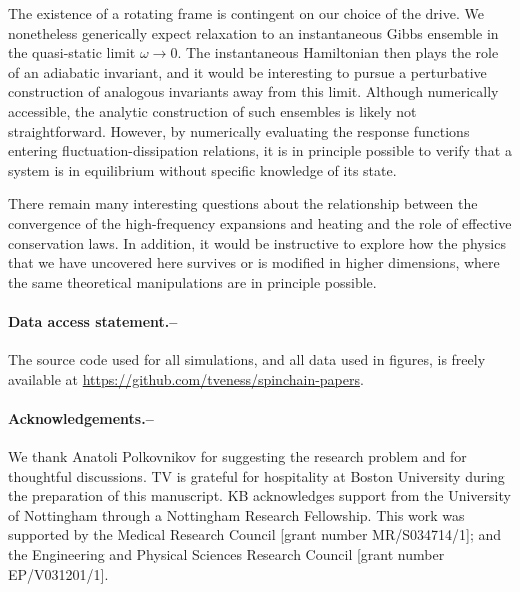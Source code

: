 \documentclass[prl,aps,twocolumn,notitlepage,10pt]{revtex4-1}
\begin{document}
The existence of a rotating frame is contingent on our choice of the drive.
We nonetheless generically expect relaxation to an instantaneous Gibbs ensemble
in the quasi-static limit $\omega \to 0$.
The instantaneous Hamiltonian then plays the role of an adiabatic invariant,
and it would be interesting to pursue a perturbative construction of analogous
invariants away from this limit.
Although numerically accessible, the analytic construction of such ensembles is
likely not straightforward.
However, by numerically evaluating the response functions entering
fluctuation-dissipation relations, it is in principle possible to verify that a
system is in equilibrium without specific knowledge of its state.

There remain many interesting questions about the relationship between the
convergence of the high-frequency expansions and heating and the role of
effective conservation laws.
In addition, it would be instructive to explore how the physics that we have
uncovered here survives or is modified in higher dimensions, where the same
theoretical manipulations are in principle possible.
\paragraph*{Data access statement.--}
The source code used for all simulations, and all data used in figures, is
freely available at \url{https://github.com/tveness/spinchain-papers}.
\begin{acknowledgements}
\paragraph*{Acknowledgements.--}
We thank Anatoli Polkovnikov for suggesting the research problem and for
thoughtful discussions.
TV is grateful for hospitality at Boston University during the preparation of
this manuscript.
KB acknowledges support from the University of Nottingham through a Nottingham
Research Fellowship. This work was supported by the Medical Research Council
  [grant number MR/S034714/1]; and the Engineering and Physical Sciences Research
Council [grant number EP/V031201/1].
\end{acknowledgements}

\end{document}
